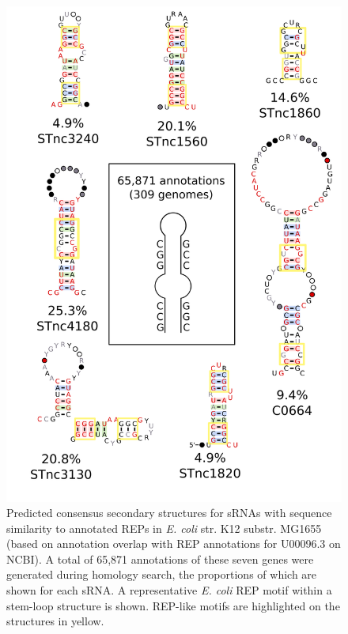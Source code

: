\begin{figure}[H]
\centering
        \includegraphics[scale=0.75]{sal/REP_motifs.png}
    \caption[Predicted consensus secondary structures for sRNAs with sequence similarity to REPs]{Predicted consensus secondary structures for sRNAs with sequence similarity to annotated REPs in  \textit{E. coli} str. K12 substr. MG1655 (based on annotation overlap with REP annotations for U00096.3 on NCBI). A total of 65,871 annotations of these seven genes were generated during homology search, the proportions of which are shown for each sRNA. A representative \textit{E. coli} REP motif \citep{Tobes2006-kd} within a stem-loop structure is shown. REP-like motifs are highlighted on the structures in yellow.}
    \label{fig:REP_motifs}
\end{figure}
\newpage

